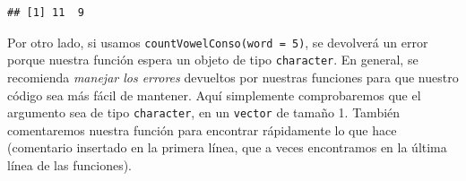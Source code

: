 \documentclass[
]{book}
\newenvironment{Shaded}{\begin{snugshade}}{\end{snugshade}}
\newcommand{\CommentTok}[1]{\textcolor[rgb]{0.56,0.35,0.01}{\textit{#1}}}
\newcommand{\ControlFlowTok}[1]{\textcolor[rgb]{0.13,0.29,0.53}{\textbf{#1}}}
\newcommand{\DataTypeTok}[1]{\textcolor[rgb]{0.13,0.29,0.53}{#1}}
\newcommand{\DecValTok}[1]{\textcolor[rgb]{0.00,0.00,0.81}{#1}}
\newcommand{\KeywordTok}[1]{\textcolor[rgb]{0.13,0.29,0.53}{\textbf{#1}}}
\newcommand{\NormalTok}[1]{#1}
\newcommand{\OperatorTok}[1]{\textcolor[rgb]{0.81,0.36,0.00}{\textbf{#1}}}
\newcommand{\StringTok}[1]{\textcolor[rgb]{0.31,0.60,0.02}{#1}}
\begin{document}
\begin{verbatim}
## [1] 11  9
\end{verbatim}

Por otro lado, si usamos \texttt{countVowelConso(word\ =\ 5)}, se devolverá un error porque nuestra función espera un objeto de tipo \texttt{character}. En general, se recomienda \emph{manejar los errores} devueltos por nuestras funciones para que nuestro código sea más fácil de mantener. Aquí simplemente comprobaremos que el argumento sea de tipo \texttt{character}, en un \texttt{vector} de tamaño 1. También comentaremos nuestra función para encontrar rápidamente lo que hace (comentario insertado en la primera línea, que a veces encontramos en la última línea de las funciones).

\begin{Shaded}
\end{Shaded}
\end{document}
